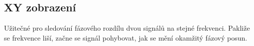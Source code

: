 \documentclass[twoside]{article}
\begin{document}

\subsection{XY zobrazení}
Užitečné pro sledování fázového rozdílu dvou signálů na stejné frekvenci.
Pakliže se frekvence liší, začne se signál pohybovat, jak se mění okamžitý fázový posun.
\end{document}
